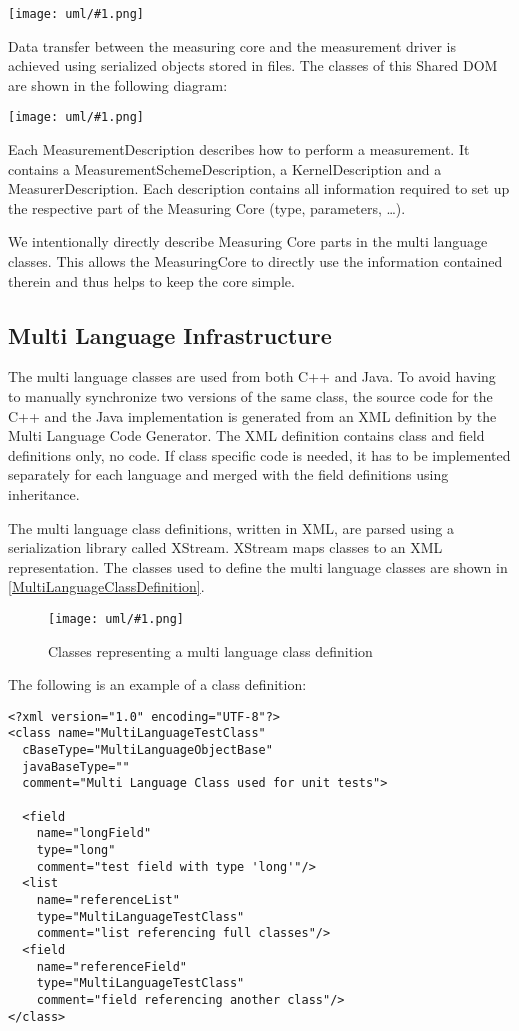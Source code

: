 \documentclass[a4paper,12pt]{article}
\newcommand{\umlDiagram}[1]{\begin{center}\texttt{[image: uml/\#1.png]}\end{center}}
\newcommand{\umlFloat}[2]{
\begin{figure}[tbh]
\umlDiagram{#1}
\caption{#2}
\label{#1}
\end{figure}
}
\newcommand{\umlRef}[1]{\autoref{#1}}
\begin{document}
\umlDiagram{ToolComponents}

Data transfer between the measuring core and the measurement driver is achieved using serialized objects stored in files. The classes of this Shared DOM are shown in the following diagram:

\umlDiagram{MultiLanguageClasses}

Each MeasurementDescription describes how to perform a measurement. It contains a MeasurementSchemeDescription, a KernelDescription and a MeasurerDescription. Each description contains all information required to set up the respective part of the Measuring Core (type, parameters, \ldots).

We intentionally directly describe Measuring Core parts in the multi language classes. This allows the MeasuringCore to directly use the information contained therein and thus helps to keep the core simple.

\subsection{Multi Language Infrastructure}
The multi language classes are used from both C++ and Java. To avoid having to manually synchronize two versions of the same class, the source code for the C++ and the Java implementation is generated from an XML definition by the Multi Language Code Generator. The XML definition contains class and field definitions only, no code. If class specific code is needed, it has to be implemented separately for each language and merged with the field definitions using inheritance.

The multi language class definitions, written in XML, are parsed using a serialization library called XStream. XStream maps classes to an XML representation. The classes used to define the multi language classes are shown in \umlRef{MultiLanguageClassDefinition}.

\umlFloat{MultiLanguageClassDefinition}{Classes representing a multi language class definition}

The following is an example of a class definition:
\begin{verbatim}
<?xml version="1.0" encoding="UTF-8"?>
<class name="MultiLanguageTestClass" 
  cBaseType="MultiLanguageObjectBase"
  javaBaseType=""
  comment="Multi Language Class used for unit tests">

  <field 
    name="longField" 
    type="long" 
    comment="test field with type 'long'"/>
  <list  
    name="referenceList" 
    type="MultiLanguageTestClass" 
    comment="list referencing full classes"/>
  <field 
    name="referenceField" 
    type="MultiLanguageTestClass" 
    comment="field referencing another class"/>
</class>
\end{verbatim}
\end{document}
